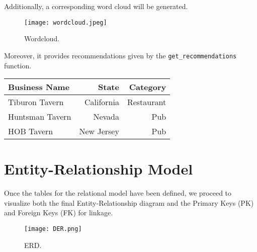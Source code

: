 \documentclass[12pt]{article}
\begin{document}
Additionally, a corresponding word cloud will be generated.
\begin{figure}[H]
  \centering
  \texttt{[image: wordcloud.jpeg]}
  \caption{Wordcloud.}
  \label{fig: Wordcloud}
\end{figure}

Moreover, it provides recommendations given by the \texttt{get\_recommendations} function.

\begin{tabular}{|l|r|r|}
\hline
Business Name & State & Category \\
\hline
Tiburon Tavern & California & Restaurant \\
Huntsman Tavern & Nevada & Pub \\
HOB Tavern & New Jersey & Pub \\
\hline
\end{tabular}

\section{Entity-Relationship Model}

Once the tables for the relational model have been defined, we proceed to visualize both the final Entity-Relationship diagram and the Primary Keys (PK) and Foreign Keys (FK) for linkage.

\begin{figure}[H]
  \centering
  \texttt{[image: DER.png]}
  \caption{ERD.}
  \label{fig:ERD}
\end{figure}
\end{document}
